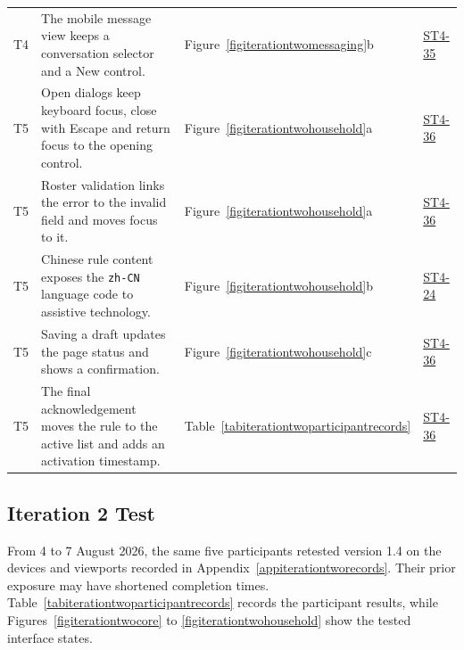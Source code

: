 \documentclass[11pt,a4paper]{article}
\begin{document}
{\begin{longtable}{@{}L{0.8cm}L{8.1cm}L{2.5cm}L{2.2cm}@{}}
    T4 &
    The mobile message view keeps a conversation selector and a New
    control. &
    Figure~\ref{figiterationtwomessaging}b &
    \href{https://unsw-team-desn-seng2026.atlassian.net/browse/ST4-35}{ST4-35}\\

    T5 &
    Open dialogs keep keyboard focus, close with Escape and return focus to
    the opening control. &
    Figure~\ref{figiterationtwohousehold}a &
    \href{https://unsw-team-desn-seng2026.atlassian.net/browse/ST4-36}{ST4-36}\\

    T5 &
    Roster validation links the error to the invalid field and moves focus
    to it. &
    Figure~\ref{figiterationtwohousehold}a &
    \href{https://unsw-team-desn-seng2026.atlassian.net/browse/ST4-36}{ST4-36}\\

    T5 &
    Chinese rule content exposes the \texttt{zh-CN} language code to
    assistive technology. &
    Figure~\ref{figiterationtwohousehold}b &
    \href{https://unsw-team-desn-seng2026.atlassian.net/browse/ST4-24}{ST4-24}\\

    T5 &
    Saving a draft updates the page status and shows a confirmation. &
    Figure~\ref{figiterationtwohousehold}c &
    \href{https://unsw-team-desn-seng2026.atlassian.net/browse/ST4-36}{ST4-36}\\

    T5 &
    The final acknowledgement moves the rule to the active list and adds an
    activation timestamp. &
    Table~\ref{tabiterationtwoparticipantrecords} &
    \href{https://unsw-team-desn-seng2026.atlassian.net/browse/ST4-36}{ST4-36}\\
\end{longtable}
}

\subsection{Iteration 2 Test}
\label{subseciterationtwotest}

From 4 to 7 August 2026, the same five participants retested version 1.4 on
the devices and viewports recorded in
Appendix~\ref{appiterationtworecords}. Their prior exposure may have shortened
completion times. Table~\ref{tabiterationtwoparticipantrecords} records the
participant results, while Figures~\ref{figiterationtwocore} to
\ref{figiterationtwohousehold} show the tested interface states.
\end{document}
